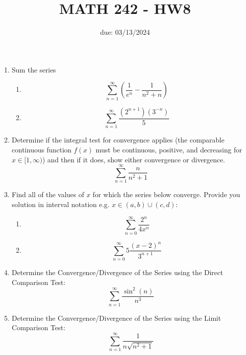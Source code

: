 \documentclass[12pt]{article}
\title{MATH 242 - HW8}
\date{due: 03/13/2024}
\begin{document}
\maketitle

\begin{enumerate}
\item Sum the series
\begin{enumerate}
    \item $$\sum_{n=1}^{\infty}\left(\frac{1}{e^n}-\frac{1}{n^2+n}\right)$$
    \newpage
    \item $$\sum_{n=1}^{\infty}\frac{(2^{n+1})(3^{-n})}{5}$$
    \vfill
\end{enumerate}

\item Determine if the integral test for convergence applies (the comparable continuous function $f(x)$ must be continuous, positive, and decreasing for $x\in[1,\infty)$) and then if it does, show either convergence or divergence.
$$\sum_{n=1}^{\infty}\frac{n}{n^2+1}$$
\vfill
\newpage
\item Find all of the values of $x$ for which the series below converge. Provide you solution in interval notation e.g. $x\in(a,b)\cup(c,d)$:
\begin{enumerate}
    \item $$\sum_{n=0}^{\infty}\frac{2^n}{4x^n}$$
    \vfill
    \item $$\sum_{n=0}^{\infty}5\frac{(x-2)^n}{3^{n+1}}$$
    \vfill
    \newpage
\end{enumerate}
\item Determine the Convergence/Divergence of the Series using the Direct Comparison Test: $$\sum_{n=1}^{\infty}\frac{\sin^2(n)}{n^3}$$
\vfill
\item Determine the Convergence/Divergence of the Series using the Limit Comparison Test: $$\sum_{n=1}^{\infty}\frac{1}{n\sqrt{n^2+1}}$$
\vfill
\end{enumerate}
\end{document}
